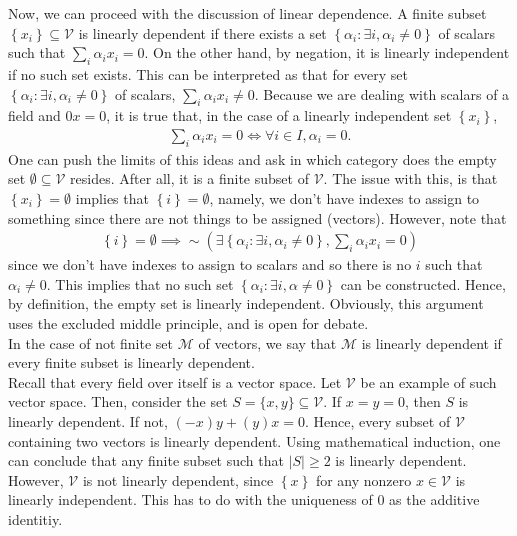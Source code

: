 \documentclass[12pt]{article}
\begin{document}
Now, we can proceed with the discussion of linear dependence. A finite subset $\left\{ x_{i} \right\}\subseteq \mathcal{V}$ is linearly dependent if there exists a set $\left\{ \alpha_{i} : \exists i, \alpha_{i} \neq 0\right\}$ of scalars such that $\sum_{i} \alpha_{i}x_{i} = 0$. On the other hand, by negation, it is linearly independent if no such set exists. This can be interpreted as that for every set $\left\{ \alpha_{i}: \exists i, \alpha_{i}\neq 0 \right\}$ of scalars, $\sum_{i} \alpha_{i}x_{i} \neq 0$. Because we are dealing with scalars of a field and $0x = 0$, it is true that, in the case of a linearly independent set $\left\{ x_{i} \right\}$,   
\begin{align*}
  \sum_{i} \alpha_{i}x_{i} =0 \iff \forall i\in I, \alpha_{i} = 0.
\end{align*}
One can push the limits of this ideas and ask in which category does the empty set $\emptyset \subseteq \mathcal{V}$ resides. After all, it is a finite subset of $\mathcal{V}$. The issue with this, is that $\left\{ x_{i} \right\} = \emptyset$ implies that $\left\{ i \right\}=\emptyset$, namely, we don't have indexes to assign to something since there are not things to be assigned (vectors). However, note that  
\begin{align*}
  \left\{ i \right\}=\emptyset \implies \sim \left( \exists \left\{ \alpha_{i}:\exists i, \alpha_{i} \neq 0 \right\}, \sum_{i}\alpha_{i} x_{i} = 0 \right)
\end{align*}
since we don't have indexes to assign to scalars and so there is no $i$ such that $\alpha_{i} \neq 0$. This implies that no such set $\left\{ \alpha_{i}: \exists i, \alpha\neq 0 \right\}$ can be constructed. Hence, by definition, the empty set is linearly independent. Obviously, this argument uses the excluded middle principle, and is open for debate.\\
In the case of not finite set $\mathcal{M}$ of vectors, we say that $\mathcal{M}$ is linearly dependent if every finite subset is linearly dependent.\\

Recall that every field over itself is a vector space. Let $\mathcal{V}$ be an example of such vector space. Then, consider the set $S=\{x,y\}\subseteq \mathcal{V}$. If $x=y=0$, then $S$ is linearly dependent. If not, $(-x)y + (y)x = 0$. Hence, every subset of $\mathcal{V}$ containing two vectors is linearly dependent. Using mathematical induction, one can conclude that any finite subset such that $|S|\geq 2$ is linearly dependent. However, $\mathcal{V}$ is not linearly dependent, since $\left\{ x \right\}$ for any nonzero $x\in\mathcal{V}$ is linearly independent. This has to do with the uniqueness of $0$ as the additive identitiy.
\end{document}
